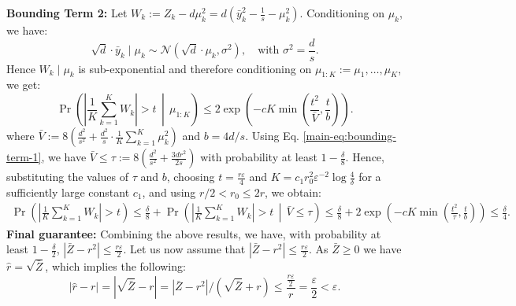 \noindent
\textbf{Bounding Term 2:}  Let $W_k := Z_k - d\mu_k^2 = d\left( \bar{y}_k^2 - \frac{1}{s} - \mu_k^2 \right)$. Conditioning on $\mu_k$, we have:
\[
\sqrt{d} \cdot \bar{y}_k \mid \mu_k \sim \mathcal{N}(\sqrt{d}\cdot\mu_k, \sigma^2), \quad \text{with } \sigma^2 = \frac{d}{s}.
\]
Hence $W_k \mid \mu_k$ is sub-exponential and therefore conditioning on $\mu_{1:K} := \mu_1, \ldots, \mu_K$, we get:
\[
\Pr\left( \left| \frac{1}{K} \sum_{k=1}^{K} W_k \right| > t \,\middle|\, \mu_{1:K} \right) 
\leq 2 \exp\left( -cK \min\left( \frac{t^2}{\bar{V}}, \frac{t}{b} \right) \right).
\]
where $
\bar{V} := 8 \left( \frac{d^2}{s^2} + \frac{d^2}{s} \cdot \frac{1}{K} \sum_{k=1}^{K} \mu_k^2 \right)
$ and $b=4d/s$. Using Eq. \eqref{main-eq:bounding-term-1}, we have $
\bar{V} \leq \tau := 8 \left( \frac{d^2}{s^2} + \frac{3dr^2}{2s} \right)$ with probability at least $1 - \frac{\delta}{8}$. Hence, substituting the values of $\tau$ and $b$, choosing $t=\frac{r\varepsilon}{4}$ and $K=c_1 r_0^2 \varepsilon^{-2}\log\!\frac{4}{\delta}$ for a sufficiently large constant $c_1$, and using $r/2<r_0\le 2r$, we obtain:
\begin{align*}
    \Pr\left( \left| \frac{1}{K} \sum_{k=1}^{K} W_k \right| > t \right)\leq \frac{\delta}{8} + \Pr\left( \left| \frac{1}{K} \sum_{k=1}^{K} W_k \right| > t \,\middle|\, \bar{V} \leq \tau \right)\leq \frac{\delta}{8}+ 2 \exp\left( -cK \min\left( \frac{t^2}{\tau}, \frac{t}{b} \right) \right)\leq \frac{\delta}{4}.
\end{align*}
\noindent
\textbf{Final guarantee:} Combining the above results, we have, with probability at least $1 - \frac{\delta}{2}$, $\left| \bar{Z} - r^2 \right| \leq \frac{r \varepsilon}{2}$. Let us now assume that $\left| \bar{Z} - r^2 \right| \leq \frac{r \varepsilon}{2}$. As $\bar{Z}\geq 0$ we have $\hat{r}=\sqrt{\bar{Z}}$, which implies the following:
    \[
    |\hat{r} - r| = \left| \sqrt{\bar{Z}} - r \right| 
    = \left| \bar{Z} - r^2 \right| \bigg/ \left( \sqrt{\bar{Z}} + r \right)
    \leq \frac{\frac{r \varepsilon}{2}}{r}
    = \frac{\varepsilon}{2} < \varepsilon.
    \]



